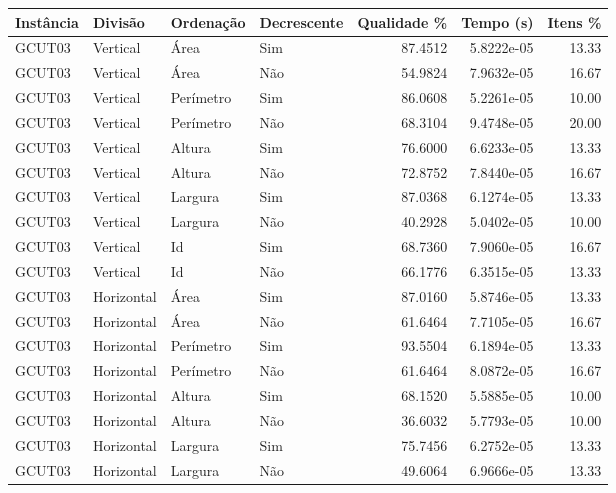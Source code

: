\begin{tabular}{llllrrr}
    \hline
    Instância & Divisão     & Ordenação & Decrescente & Qualidade \% & Tempo (s)  & Itens \% \\
    \hline
    GCUT03    & Vertical    & Área      & Sim         & 87.4512      & 5.8222e-05 & 13.33    \\
    GCUT03    & Vertical    & Área      & Não         & 54.9824      & 7.9632e-05 & 16.67    \\
    GCUT03    & Vertical    & Perímetro & Sim         & 86.0608      & 5.2261e-05 & 10.00    \\
    GCUT03    & Vertical    & Perímetro & Não         & 68.3104      & 9.4748e-05 & 20.00    \\
    GCUT03    & Vertical    & Altura    & Sim         & 76.6000      & 6.6233e-05 & 13.33    \\
    GCUT03    & Vertical    & Altura    & Não         & 72.8752      & 7.8440e-05 & 16.67    \\
    GCUT03    & Vertical    & Largura   & Sim         & 87.0368      & 6.1274e-05 & 13.33    \\
    GCUT03    & Vertical    & Largura   & Não         & 40.2928      & 5.0402e-05 & 10.00    \\
    GCUT03    & Vertical    & Id        & Sim         & 68.7360      & 7.9060e-05 & 16.67    \\
    GCUT03    & Vertical    & Id        & Não         & 66.1776      & 6.3515e-05 & 13.33    \\
    GCUT03    & Horizontal  & Área      & Sim         & 87.0160      & 5.8746e-05 & 13.33    \\
    GCUT03    & Horizontal  & Área      & Não         & 61.6464      & 7.7105e-05 & 16.67    \\
    GCUT03    & Horizontal  & Perímetro & Sim         & 93.5504      & 6.1894e-05 & 13.33    \\
    GCUT03    & Horizontal  & Perímetro & Não         & 61.6464      & 8.0872e-05 & 16.67    \\
    GCUT03    & Horizontal  & Altura    & Sim         & 68.1520      & 5.5885e-05 & 10.00    \\
    GCUT03    & Horizontal  & Altura    & Não         & 36.6032      & 5.7793e-05 & 10.00    \\
    GCUT03    & Horizontal  & Largura   & Sim         & 75.7456      & 6.2752e-05 & 13.33    \\
    GCUT03    & Horizontal  & Largura   & Não         & 49.6064      & 6.9666e-05 & 13.33    \\

\end{tabular}
